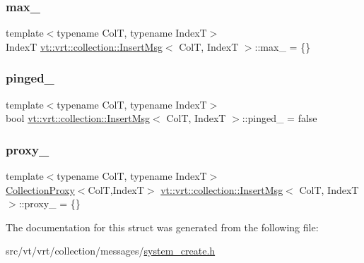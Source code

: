\mbox{\label{structvt_1_1vrt_1_1collection_1_1_insert_msg_a8e6cba1aa922c74d219db407343530b1}} 
\subsubsection{\texorpdfstring{max\+\_\+}{max\_}}
{\footnotesize\ttfamily template$<$typename ColT, typename IndexT$>$ \\
IndexT \hyperlink{structvt_1_1vrt_1_1collection_1_1_insert_msg}{vt\+::vrt\+::collection\+::\+Insert\+Msg}$<$ ColT, IndexT $>$\+::max\+\_\+ = \{\}}

\mbox{\label{structvt_1_1vrt_1_1collection_1_1_insert_msg_af58c873ef6a1c91a5a3d8cbf9de619a1}} 
\subsubsection{\texorpdfstring{pinged\+\_\+}{pinged\_}}
{\footnotesize\ttfamily template$<$typename ColT, typename IndexT$>$ \\
bool \hyperlink{structvt_1_1vrt_1_1collection_1_1_insert_msg}{vt\+::vrt\+::collection\+::\+Insert\+Msg}$<$ ColT, IndexT $>$\+::pinged\+\_\+ = false}

\mbox{\label{structvt_1_1vrt_1_1collection_1_1_insert_msg_a7f679b8e031239c31fe8061e9a18f568}} 
\subsubsection{\texorpdfstring{proxy\+\_\+}{proxy\_}}
{\footnotesize\ttfamily template$<$typename ColT, typename IndexT$>$ \\
\hyperlink{structvt_1_1vrt_1_1collection_1_1_collection_proxy}{Collection\+Proxy}$<$ColT,IndexT$>$ \hyperlink{structvt_1_1vrt_1_1collection_1_1_insert_msg}{vt\+::vrt\+::collection\+::\+Insert\+Msg}$<$ ColT, IndexT $>$\+::proxy\+\_\+ = \{\}}



The documentation for this struct was generated from the following file\+:\begin{DoxyCompactItemize}
\item 
src/vt/vrt/collection/messages/\hyperlink{system__create_8h}{system\+\_\+create.\+h}\end{DoxyCompactItemize}
